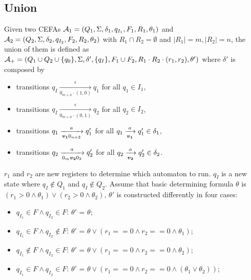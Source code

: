 \subsection{Union}\label{subsec:union}
Given two CEFAs $\mathcal{A}_1 = (Q_1, \Sigma, \delta_1, q_{I_1}, F_1, R_1, \theta_1)$ and $\mathcal{A}_2 = (Q_2, \Sigma, \delta_2, q_{I_2}, F_2, R_2, \theta_2)$ with $R_1\cap R_2 = \emptyset$ and $|R_1|=m,|R_2|=n$, the union of them is defined as $\mathcal{A}_{+} = (Q_1\cup Q_2\cup\{q_0\}, \Sigma, \delta', \{q_I\}, F_1\cup F_2, R_1\cdot R_2\cdot (r_1, r_2), \theta')$ where $\delta'$ is composed by
\begin{itemize}
  \item transitions $q_I\xrightarrow[0_{m+n}\cdot(1,0)]{\epsilon}q_1$ for all $q_1\in I_1$,
  \item transitions $q_I\xrightarrow[0_{m+n}\cdot(0,1)]{\epsilon}q_2$ for all $q_2\in I_2$,
  \item transitions $q_1\xrightarrow[\myvec{v_1}0_{n+2}]{a} q_1'$ for all $q_1\xrightarrow[\myvec{v_1}]{a} q_1'\in \delta_1$,
  \item transitions $q_2\xrightarrow[0_m\myvec{v_2}0_2]{a} q_2'$ for all $q_2\xrightarrow[\myvec{v_2}]{a} q_2'\in \delta_2$.
\end{itemize}
$r_1$ and $r_2$ are new registers to determine which automaton to run. $q_I$ is a new state where $q_I\not\in Q_1$ and $q_I\not\in Q_2$. Assume that basic determining formula $\theta$  is $(r_1>0\wedge\theta_1)\vee(r_2>0\wedge\theta_2)$, $\theta'$ is constructed differently in four cases:
\begin{itemize}
  \item $q_{I_1}\in F\wedge q_{I_2}\in F$: $\theta'$ = $\theta $;
  \item $q_{I_1}\in F\wedge q_{I_2}\not\in F$: $\theta'$ = $\theta \vee (r_1==0\wedge r_2==0\wedge\theta_1)$;
  \item $q_{I_1}\not\in F\wedge q_{I_2}\in F$: $\theta'$ = $\theta \vee (r_1==0\wedge r_2==0\wedge\theta_2)$;
  \item $q_{I_1}\in F\wedge q_{I_2}\in F$: $\theta'$ = $\theta \vee (r_1==0\wedge r_2==0\wedge(\theta_1\vee\theta_2))$;
\end{itemize}

